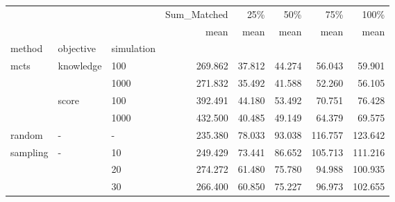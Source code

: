 \begin{tabular}{lllrrrrr}
\toprule
         &   &    & Sum\_Matched &    25\% &    50\% &     75\% &    100\% \\
         &   &    &        mean &   mean &   mean &    mean &    mean \\
method & objective & simulation &             &        &        &         &         \\
\midrule
mcts & knowledge & 100 &     269.862 & 37.812 & 44.274 &  56.043 &  59.901 \\
         &   & 1000 &     271.832 & 35.492 & 41.588 &  52.260 &  56.105 \\
         & score & 100 &     392.491 & 44.180 & 53.492 &  70.751 &  76.428 \\
         &   & 1000 &     432.500 & 40.485 & 49.149 &  64.379 &  69.575 \\
random & - & - &     235.380 & 78.033 & 93.038 & 116.757 & 123.642 \\
sampling & - & 10 &     249.429 & 73.441 & 86.652 & 105.713 & 111.216 \\
         &   & 20 &     274.272 & 61.480 & 75.780 &  94.988 & 100.935 \\
         &   & 30 &     266.400 & 60.850 & 75.227 &  96.973 & 102.655 \\
\bottomrule
\end{tabular}
